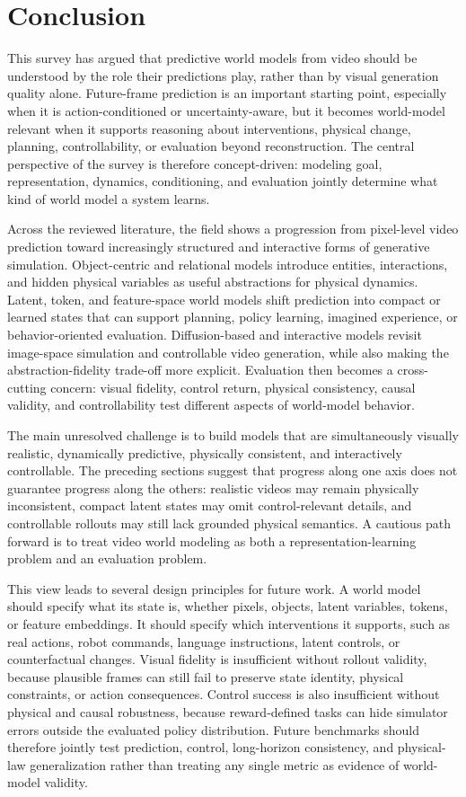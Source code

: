 \section{Conclusion}

This survey has argued that predictive world models from video should be understood by the role their predictions play, rather than by visual generation quality alone. Future-frame prediction is an important starting point, especially when it is action-conditioned or uncertainty-aware, but it becomes world-model relevant when it supports reasoning about interventions, physical change, planning, controllability, or evaluation beyond reconstruction. The central perspective of the survey is therefore concept-driven: modeling goal, representation, dynamics, conditioning, and evaluation jointly determine what kind of world model a system learns.

Across the reviewed literature, the field shows a progression from pixel-level video prediction toward increasingly structured and interactive forms of generative simulation. Object-centric and relational models introduce entities, interactions, and hidden physical variables as useful abstractions for physical dynamics. Latent, token, and feature-space world models shift prediction into compact or learned states that can support planning, policy learning, imagined experience, or behavior-oriented evaluation. Diffusion-based and interactive models revisit image-space simulation and controllable video generation, while also making the abstraction-fidelity trade-off more explicit. Evaluation then becomes a cross-cutting concern: visual fidelity, control return, physical consistency, causal validity, and controllability test different aspects of world-model behavior.

The main unresolved challenge is to build models that are simultaneously visually realistic, dynamically predictive, physically consistent, and interactively controllable. The preceding sections suggest that progress along one axis does not guarantee progress along the others: realistic videos may remain physically inconsistent, compact latent states may omit control-relevant details, and controllable rollouts may still lack grounded physical semantics. A cautious path forward is to treat video world modeling as both a representation-learning problem and an evaluation problem.

This view leads to several design principles for future work. A world model should specify what its state is, whether pixels, objects, latent variables, tokens, or feature embeddings. It should specify which interventions it supports, such as real actions, robot commands, language instructions, latent controls, or counterfactual changes. Visual fidelity is insufficient without rollout validity, because plausible frames can still fail to preserve state identity, physical constraints, or action consequences. Control success is also insufficient without physical and causal robustness, because reward-defined tasks can hide simulator errors outside the evaluated policy distribution. Future benchmarks should therefore jointly test prediction, control, long-horizon consistency, and physical-law generalization rather than treating any single metric as evidence of world-model validity.
